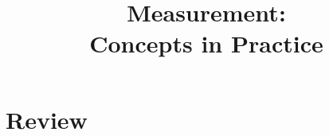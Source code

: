 
\usepackage{tikz}
\usetikzlibrary{shapes,arrows,decorations.pathreplacing,calc}


\newcommand{\nt}[2][0pt]{%
    \stepcounter{itemnum}%
    \if###2##%
    \else
        #2%
        \thinspace
    \fi
    \tikz[overlay,remember picture,baseline=(\theitemnum.base),xshift=#1]\node (\theitemnum){};%
}

\newcommand{\makebrace}[4][0pt]{%
    \begin{tikzpicture}[overlay, remember picture]
        \draw [decoration={brace,amplitude=0.5em},decorate]
        let \p1=(#2), \p2=(#3) in
        ({max(\x1+#1,\x2+#1)}, {\y1+1.75ex}) -- 
            node[right=0.6em] {#4} ({max(\x1+#1,\x2+#1)}, {\y2-0.5ex});
    \end{tikzpicture}%
}

\newenvironment{braceitems}{%
    \begin{enumerate}
}{%
    \end{enumerate}
    \setcounter{itemnum}{0}%
}


\title{Measurement:\\Concepts in Practice}


\date[]{}



\frame{\titlepage}

\frame{\tableofcontents}


\section{Review}
\frame{\tableofcontents[currentsection]}



